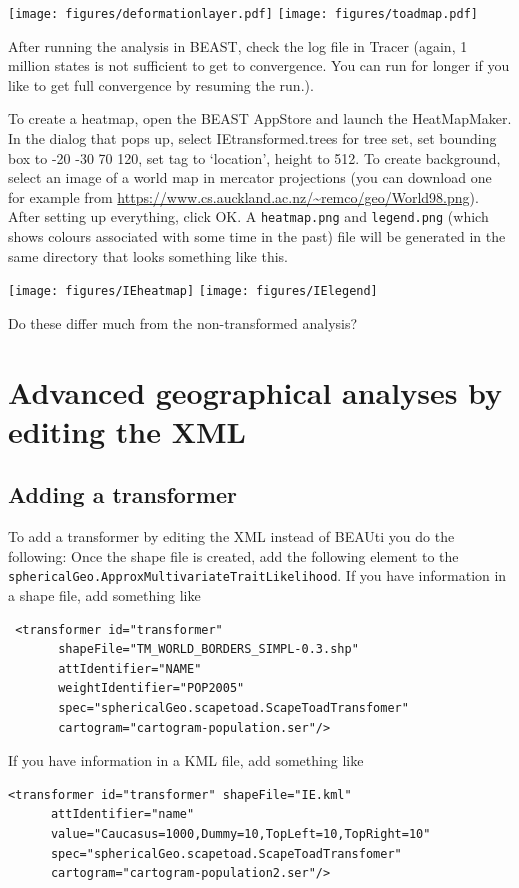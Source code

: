 \documentclass{article}
\begin{document}
\texttt{[image: figures/deformationlayer.pdf]}
\texttt{[image: figures/toadmap.pdf]}

After running the analysis in BEAST, check the log file in Tracer (again, 1 million states is not sufficient to get to convergence. You can run for longer if you like to get full convergence by resuming the run.).

To create a heatmap, open the BEAST AppStore and launch the HeatMapMaker. In the dialog that pops up, select IEtransformed.trees for tree set, set bounding box to -20 -30 70 120, set tag to `location', height to 512. To create background, select an image of a world map in mercator projections (you can download one for example from \url{https://www.cs.auckland.ac.nz/~remco/geo/World98.png}). After setting up everything, click OK. A {\tt heatmap.png} and {\tt legend.png} (which shows colours associated with some time in the past) file will be generated in the same directory that looks something like this.

\texttt{[image: figures/IEheatmap]}
\texttt{[image: figures/IElegend]}

Do these differ much from the non-transformed analysis?

\section*{Advanced geographical analyses by editing the XML}
\subsection*{Adding a transformer}
To add a transformer by editing the XML instead of BEAUti you do the following: Once the shape file is created, add the following element to the {\tt sphericalGeo.ApproxMultivariateTraitLikelihood}. If you have information in a shape file, add something like

\begin{verbatim}
 <transformer id="transformer" 
       shapeFile="TM_WORLD_BORDERS_SIMPL-0.3.shp" 
       attIdentifier="NAME" 
       weightIdentifier="POP2005" 
       spec="sphericalGeo.scapetoad.ScapeToadTransfomer"
       cartogram="cartogram-population.ser"/> 
 \end{verbatim}

If you have information in a KML file, add something like

\begin{verbatim}
<transformer id="transformer" shapeFile="IE.kml"
      attIdentifier="name"
      value="Caucasus=1000,Dummy=10,TopLeft=10,TopRight=10"
      spec="sphericalGeo.scapetoad.ScapeToadTransfomer"
      cartogram="cartogram-population2.ser"/>
\end{verbatim}
\end{document}
